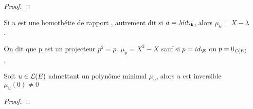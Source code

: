 \begin{proof}
\end{proof}

\begin{example}
	Si $u$ est une homothétie de rapport \lambda, autrement dit si $u = \lambda id_\E$, alors $\mu_u = X - \lambda$.
\end{example}

\begin{remarque}
	On dit que p est un projecteur \ssi ${p}^2 = p$.
	$\mu_p = X^2 - X$ sauf si $p = id_\E$ ou $p = 0_{\mathcal{L}(E)}$.
\end{remarque}

\begin{prop}
	Soit $u \in \mathcal{L}(E)$ admettant un polynôme minimal $\mu_u$, alors $u$ est inversible \ssi $\mu_u(0) \neq 0$
\end{prop}

\begin{proof}
\end{proof}